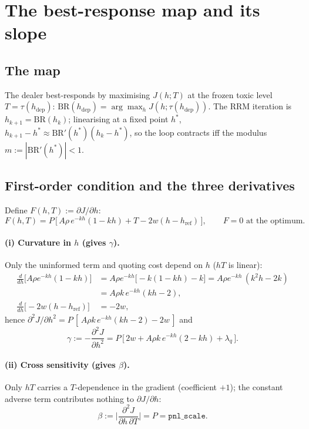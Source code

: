 \documentclass[11pt]{article}
\newcommand{\hdep}{h_{\mathrm{dep}}}
\newcommand{\href}{h_{\mathrm{ref}}}
\newcommand{\code}[1]{\texttt{#1}}
\newcommand{\BR}{\mathrm{BR}}
\begin{document}
\section{The best-response map and its slope}

\subsection{The map}
The dealer best-responds by maximising $J(h;T)$ at the frozen toxic level
$T=\tau(\hdep)$: $\BR(\hdep)=\arg\max_h J(h;\tau(\hdep))$. The RRM iteration is
$h_{k+1}=\BR(h_k)$; linearising at a fixed point $h^*$,
$h_{k+1}-h^*\approx \BR'(h^*)(h_k-h^*)$, so the loop contracts iff the modulus
$m:=|\BR'(h^*)|<1$.

\subsection{First-order condition and the three derivatives}
Define $F(h,T):=\partial J/\partial h$:
%
\begin{equation}\label{eq:FOC}
  F(h,T) = P\,\big[\, A\rho\,e^{-kh}(1-kh) + T - 2w(h-\href) \,\big],
  \qquad F=0 \text{ at the optimum.}
\end{equation}

\paragraph{(i) Curvature in $h$ (gives $\gamma$).}
Only the uninformed term and quoting cost depend on $h$ ($hT$ is linear):
%
\begin{align*}
  \frac{d}{dh}\!\big[A\rho e^{-kh}(1-kh)\big]
    &= A\rho e^{-kh}\big[-k(1-kh)-k\big]
     = A\rho e^{-kh}\,(k^2 h - 2k) \\
    &= A\rho k\,e^{-kh}(kh-2), \\
  \frac{d}{dh}\!\big[-2w(h-\href)\big] &= -2w,
\end{align*}
%
hence $\partial^2 J/\partial h^2 = P\,[\,A\rho k\,e^{-kh}(kh-2)-2w\,]$ and
%
\begin{equation}\label{eq:gamma}
  \boxed{\;
  \gamma := -\frac{\partial^2 J}{\partial h^2}
  = P\,\big[\, 2w + A\rho k\,e^{-kh}(2-kh) + \lambda_q \,\big].
  \;}
\end{equation}

\paragraph{(ii) Cross sensitivity (gives $\beta$).}
Only $hT$ carries a $T$-dependence in the gradient (coefficient $+1$); the
constant adverse term contributes nothing to $\partial J/\partial h$:
%
\begin{equation}\label{eq:beta}
  \boxed{\;
  \beta := \Big|\frac{\partial^2 J}{\partial h\,\partial T}\Big| = P = \code{pnl\_scale}.
  \;}
\end{equation}
\end{document}
